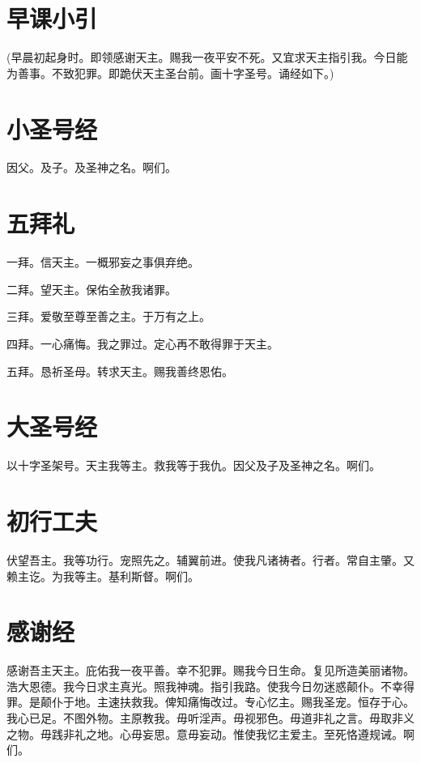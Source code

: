 \documentclass[UTF8,17pt]{ctexart}
\begin{document}
\section{早课小引}

\hfill(早晨初起身时。即领感谢天主。赐我一夜平安不死。又宜求天主指引我。今日能为善事。不致犯罪。即跪伏天主圣台前。画十字圣号。诵经如下。)

\section{小圣号经}
\label{xiao-sheng-hao-jing}

因父。及子。及圣神之名。啊们。

\section{五拜礼}
\label{wu-bai-li}

一拜。信天主。一概邪妄之事俱弃绝。 

二拜。望天主。保佑全赦我诸罪。

三拜。爱敬至尊至善之主。于万有之上。 

四拜。一心痛悔。我之罪过。定心再不敢得罪于天主。

五拜。恳祈圣母。转求天主。赐我善终恩佑。

\section{大圣号经}
\label{da-sheng-hao-jing}

以十字圣架号。天主我等主。救我等于我仇。因父及子及圣神之名。啊们。

\section{初行工夫}
\label{chu-xing-gong-fu}

伏望吾主。我等功行。宠照先之。辅翼前进。使我凡诸祷者。行者。常自主肇。又赖主讫。为我等主。基利斯督。啊们。

\section{感谢经}

感谢吾主天主。庇佑我一夜平善。幸不犯罪。赐我今日生命。复见所造美丽诸物。浩大恩德。我今日求主真光。照我神魂。指引我路。使我今日勿迷惑颠仆。不幸得罪。是颠仆于地。主速扶救我。俾知痛悔改过。专心忆主。赐我圣宠。恒存于心。我心已足。不图外物。主原教我。毋听淫声。毋视邪色。毋道非礼之言。毋取非义之物。毋践非礼之地。心毋妄思。意毋妄动。惟使我忆主爱主。至死恪遵规诫。啊们。
\end{document}
